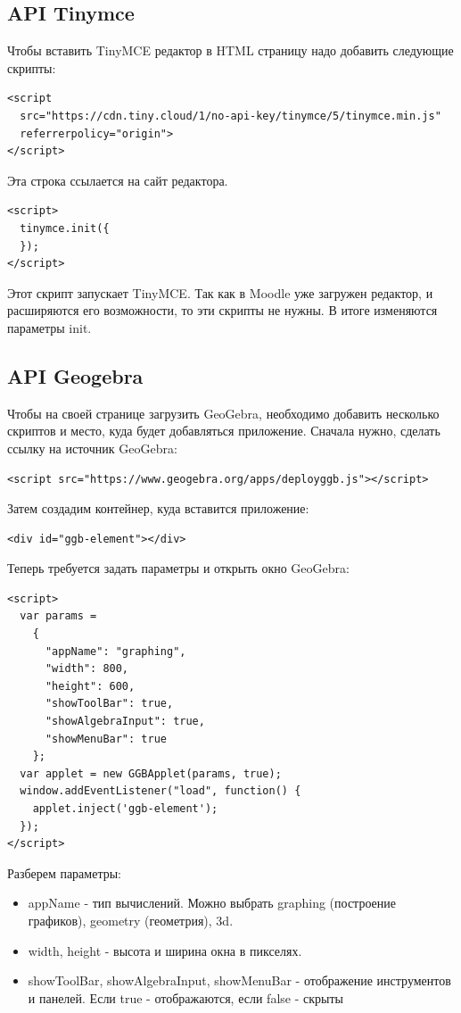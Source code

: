 \documentclass[14pt,Diplom]{diplomwork}
\begin{document}
\subsection{API Tinymce}
Чтобы вставить TinyMCE редактор в HTML страницу надо добавить следующие скрипты:
\begin{Verbatim}
<script 
  src="https://cdn.tiny.cloud/1/no-api-key/tinymce/5/tinymce.min.js" 
  referrerpolicy="origin">
</script>
\end{Verbatim}
Эта строка ссылается на сайт редактора.
\begin{Verbatim}
<script>
  tinymce.init({
  });
</script>
\end{Verbatim}
Этот скрипт запускает TinyMCE. Так как в Moodle уже загружен редактор, и расширяются его возможности, то эти скрипты не нужны. В итоге изменяются параметры init.
\subsection{API Geogebra}
Чтобы на своей странице загрузить GeoGebra, необходимо добавить несколько скриптов и место, куда будет добавляться приложение. Сначала нужно, сделать ссылку на источник GeoGebra: 
\begin{Verbatim}
<script src="https://www.geogebra.org/apps/deployggb.js"></script>
\end{Verbatim}
Затем создадим контейнер, куда вставится приложение:
\begin{Verbatim}
<div id="ggb-element"></div>
\end{Verbatim}
Теперь требуется задать параметры и открыть окно GeoGebra:
\begin{Verbatim}
<script>  
  var params = 
    {
      "appName": "graphing",
      "width": 800,
      "height": 600,
      "showToolBar": true,
      "showAlgebraInput": true, 
      "showMenuBar": true 
    };
  var applet = new GGBApplet(params, true);
  window.addEventListener("load", function() { 
    applet.inject('ggb-element');
  });
</script>
\end{Verbatim}
Разберем параметры:

\begin{itemize}
	\item appName - тип вычислений. Можно выбрать graphing (построение графиков), geometry (геометрия), 3d.
	\item width, height - высота и ширина окна в пикселях.
	\item showToolBar, showAlgebraInput, showMenuBar - отображение инструментов и панелей. Если true - отображаются, если false - скрыты
\end{itemize}
\end{document}

